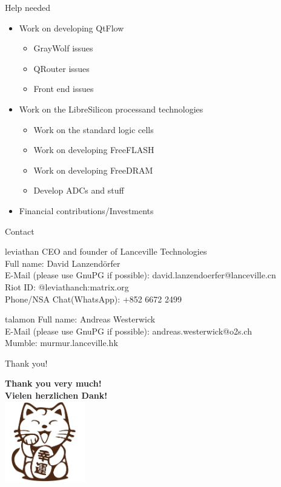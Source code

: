 \documentclass[9pt]{beamer}
\begin{document}
\begin{frame}{Help needed}
	\begin{itemize}
		\item Work on developing QtFlow
		\begin{itemize}
			\item GrayWolf issues\footnotemark
			\item QRouter issues\footnotemark
			\item Front end issues\footnotemark
		\end{itemize}
		\item Work on the LibreSilicon process\footnotemark and technologies\footnotemark
		\begin{itemize}
			\item Work on the standard logic cells
			\item Work on developing FreeFLASH
			\item Work on developing FreeDRAM
			\item Develop ADCs and stuff
		\end{itemize}
		\item Financial contributions/Investments
	\end{itemize}

\end{frame}

\begin{frame}{Contact}
	\begin{block}{leviathan}
		CEO and founder of Lanceville Technologies \\
		Full name: David Lanzendörfer \\
		E-Mail (please use GnuPG if possible): david.lanzendoerfer@lanceville.cn \\
		Riot ID: @leviathanch:matrix.org \\
		Phone/NSA Chat(WhatsApp): +852 6672 2499		
	\end{block}
	\begin{block}{talamon}
		Full name: Andreas Westerwick \\
		E-Mail (please use GnuPG if possible): andreas.westerwick@o2s.ch \\
		Mumble: murmur.lanceville.hk
	\end{block}
\end{frame}

\begin{frame}{Thank you!}
	\begin{center}
		\textbf{Thank you very much!} \\
		\textbf{Vielen herzlichen Dank!} \\
		\includegraphics[width=100pt]{cat.png}
	\end{center}
\end{frame}
\end{document}
